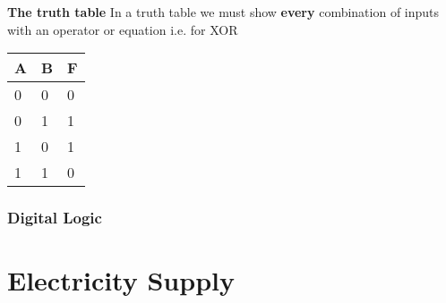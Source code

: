 \documentclass[12pt]{article}
\begin{document}
\textbf{The truth table}
In a truth table we must show \textbf{every} combination of inputs with an operator or equation i.e. for XOR

\begin{tabular}{l|l|l}
  A & B & F \\
  \hline
  0 & 0 & 0 \\
  0 & 1 & 1 \\ 
  1 & 0 & 1 \\
  1 & 1 & 0 \\
\end{tabular}

\subsubsection{Digital Logic}

\section{Electricity Supply}
\end{document}
